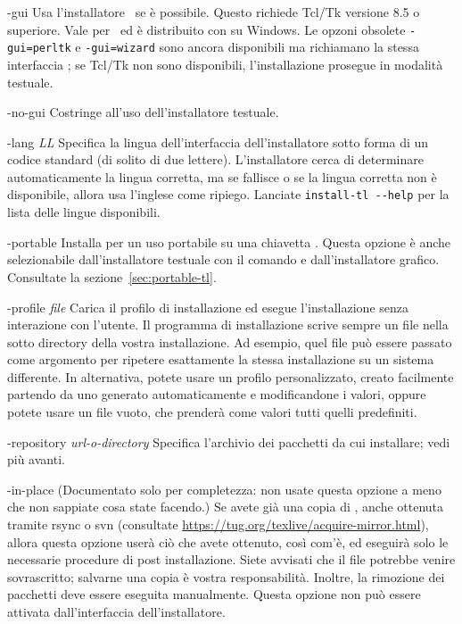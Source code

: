 \documentclass{article}
\begin{document}
\begin{ttdescription}
\item[-gui] Usa l'installatore \GUI\ se è possibile. Questo richiede Tcl/Tk
  versione 8.5 o superiore. Vale per \MacOSX\ ed è distribuito con \TL{}
  su Windows. Le opzoni obsolete \texttt{-gui=perltk} e \texttt{-gui=wizard}
  sono ancora disponibili ma richiamano la stessa interfaccia \GUI; 
  se Tcl/Tk non sono disponibili, l'installazione
  prosegue in modalità testuale.

\item[-no-gui] Costringe all'uso dell'installatore testuale.

\item[-lang {\sl LL}] Specifica la lingua dell'interfaccia
  dell'installatore sotto forma di un codice standard (di solito di due
  lettere). L'installatore cerca di determinare automaticamente la lingua
  corretta, ma se fallisce o se la lingua corretta non è disponibile,
  allora usa l'inglese come ripiego. Lanciate \verb|install-tl --help|
  per la lista delle lingue disponibili.

\item[-portable] Installa per un uso portabile su una chiavetta \USB{}.
  Questa opzione è anche selezionabile dall'installatore testuale con il 
  comando
   e dall'installatore grafico. Consultate la
  sezione~\ref{sec:portable-tl}.

\item[-profile {\sl file}] Carica il profilo di installazione  ed
  esegue l'installazione senza interazione con l'utente. Il programma di
  installazione scrive sempre un file  nella sotto
  directory  della vostra installazione. Ad esempio, quel file 
  può essere
  passato come argomento per ripetere esattamente la stessa installazione su
  un sistema differente. In alternativa, potete usare un profilo
  personalizzato, creato facilmente partendo da uno generato automaticamente
  e modificandone i valori, oppure potete usare un file vuoto, che prenderà
  come valori tutti quelli predefiniti.

\item [-repository {\sl url-o-directory}] Specifica l'archivio dei
  pacchetti da cui installare; vedi più avanti.

\item[-in-place] (Documentato solo per completezza: non usate questa
  opzione a meno che non sappiate cosa state facendo.) Se avete già una
  copia di \TL{}, anche ottenuta tramite rsync o svn (consultate
  \url{https://tug.org/texlive/acquire-mirror.html}),
  allora questa opzione userà ciò che avete ottenuto, così com'è, ed
  eseguirà solo le necessarie procedure di post installazione. Siete
  avvisati che il file  potrebbe venire
  sovrascritto; salvarne una copia è vostra responsabilità. Inoltre, la
  rimozione dei pacchetti deve essere eseguita manualmente. Questa
  opzione non può essere attivata dall'interfaccia dell'installatore.
\end{ttdescription}
\end{document}
